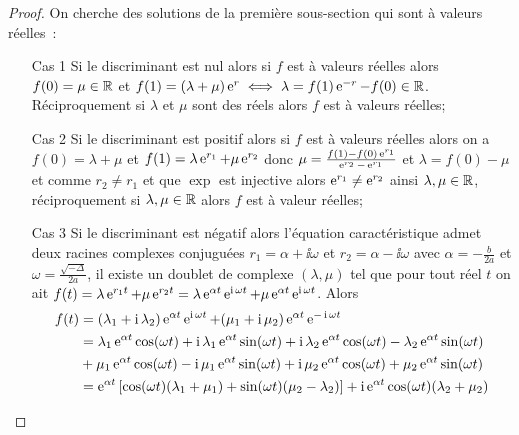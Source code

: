\begin{proof}
  On cherche des solutions de la première sous-section qui sont à valeurs réelles~:
  \begin{enumerate}
    \item[Cas 1]Si le discriminant est nul alors si \(f\) est à valeurs
      réelles alors \(f(0) = \mu \in \mathbb{R}\) et \(f(1) = (\lambda + \mu)\operatorname{e}^r
      \iff \lambda = f(1)\operatorname{e}^{-r}-f(0) \in \mathbb{R}\). Réciproquement si
      \(\lambda\) et \(\mu\) sont des réels alors \(f\) est à valeurs
      réelles;
    \item[Cas 2]Si le discriminant est positif alors si \(f\) est à valeurs
      réelles alors on a \(f(0) = \lambda + \mu\) et \(f(1) = \lambda
      \operatorname{e}^{r_1} + \mu \operatorname{e}^{r_2}\) donc \(\mu =
      \frac{f(1)-f(0)\operatorname{e}^{r_1}}{\operatorname{e}^{r_2}-\operatorname{e}^{r_1}}\) et \(\lambda = f(0) -
      \mu\) et comme \(r_2 \neq r_1\) et que \(\exp\) est injective alors
      \(\operatorname{e}^{r_1} \neq \operatorname{e}^{r_2}\) ainsi \(\lambda, \mu \in \mathbb{R}\),
      réciproquement si \(\lambda, \mu \in \mathbb{R}\) alors \(f\) est à valeur
      réelles;
    \item[Cas 3]Si le discriminant est négatif alors l'équation
      caractéristique admet deux racines complexes conjuguées \(r_1 =
      \alpha + \ii \omega\) et \(r_2 = \alpha-\ii \omega\) avec \(\alpha =
      -\frac{b}{2a}\) et \(\omega = \frac{\sqrt{-\Delta}}{2a}\), il existe
      un doublet de complexe \((\lambda, \mu)\) tel que pour tout réel
      \(t\) on ait \(f(t) = \lambda \operatorname{e}^{r_1 t} + \mu \operatorname{e}^{r_2 t} = \lambda
      \operatorname{e}^{\alpha t} \operatorname{e}^{\operatorname{i} \omega t} + \mu \operatorname{e}^{\alpha t} \operatorname{e}^{\operatorname{i} \omega
      t}\). Alors
      \begin{align}
        f(t)& = (\lambda_1 + \ii \lambda_2) \e^{\alpha t} \e^{\ii \omega
        t}  + (\mu_1 + \ii \mu_2) \e^{\alpha t} \e^{-\ii \omega t} \\
            &= \lambda_1\e^{\alpha t} \cos(\omega t) + \ii \lambda_1
            \e^{\alpha t} \sin(\omega t) + \ii \lambda_2 \e^{\alpha t}
            \cos(\omega t) - \lambda_2 \e^{\alpha t} \sin(\omega t)
            \notag \\
            &+ \mu_1\e^{\alpha t}\cos(\omega t) -\ii \mu_1 \e^{\alpha t}
            \sin(\omega t) + \ii\mu_2 \e^{\alpha t} \cos(\omega t) +
            \mu_2 \e^{\alpha t} \sin(\omega t) \\
            &= \e^{\alpha t} \left[ \cos(\omega t) (\lambda_1 + \mu_1)+
            \sin(\omega t)(\mu_2-\lambda_2)\right] + \ii\e^{\alpha t}
            \cos(\omega t) (\lambda_2 + \mu_2) \notag \\

\end{align}
\end{enumerate}
\end{proof}
